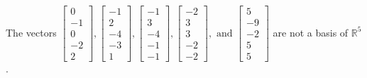 \begin{exercise}
\begin{exerciseStatement}
  \end{exerciseStatement}
  \begin{exerciseAnswer}
   The vectors \(\left[\begin{array}{r}
0 \\
-1 \\
0 \\
-2 \\
2
\end{array}\right] , \left[\begin{array}{r}
-1 \\
2 \\
-4 \\
-3 \\
1
\end{array}\right] , \left[\begin{array}{r}
-1 \\
3 \\
-4 \\
-1 \\
-1
\end{array}\right] , \left[\begin{array}{r}
-2 \\
3 \\
3 \\
-2 \\
-2
\end{array}\right] , \text{ and } \left[\begin{array}{r}
5 \\
-9 \\
-2 \\
5 \\
5
\end{array}\right]\) 
  	 are not  a basis of \(\mathbb{R}^5\).
  


  \end{exerciseAnswer}
\end{exercise}